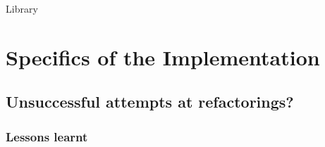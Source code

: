 Library 
\subsection{}

\subsection{}

\section{Specifics of the Implementation}
\subsection{}
\subsection{Unsuccessful attempts at refactorings?}
\subsubsection{Lessons learnt}
